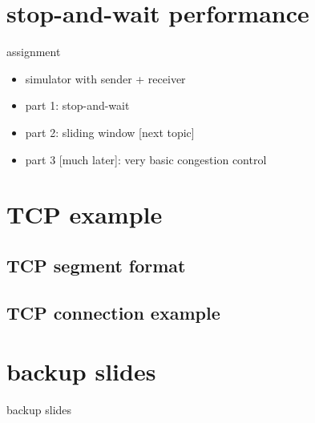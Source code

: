 \section{stop-and-wait performance}


\begin{frame}{assignment}
    \begin{itemize}
    \item simulator with sender + receiver
    \item part 1: stop-and-wait
    \item part 2: sliding window [next topic]
    \item part 3 [much later]: very basic congestion control
    \end{itemize}
\end{frame}



\section{TCP example}

\subsection{TCP segment format}


%

\subsection{TCP connection example}




\section{backup slides}
\begin{frame}{backup slides}
\end{frame}


